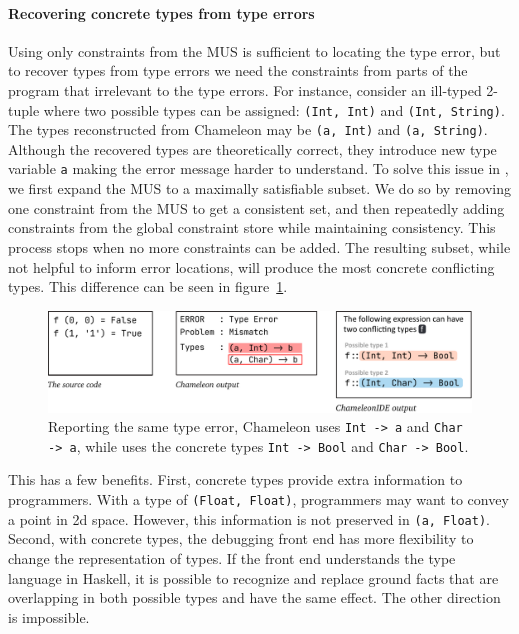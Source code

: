 \paragraph{Recovering concrete types from type errors}


Using only constraints from the MUS is sufficient to locating the type error, but to recover types from type errors we need the constraints from parts of the program that irrelevant to the type errors.  For instance, consider an ill-typed 2-tuple where two possible types can be assigned: \texttt{(Int, Int)} and \texttt{(Int, String)}. The types reconstructed from Chameleon may be \texttt{(a, Int)} and \texttt{(a, String)}. Although the recovered types are theoretically correct, they introduce new type variable \texttt{a} making the error message harder to understand.  To solve this issue in \chameleon{}, we first expand the MUS to a maximally satisfiable subset. We do so by removing one constraint from the MUS to get a consistent set, and then repeatedly adding constraints from the global constraint store while maintaining consistency. This process stops when no more constraints can be added. The resulting subset, while not helpful to inform error locations, will produce the most concrete conflicting types. This difference can be seen in figure~\ref{fig:compare-to-original}. 


\begin{figure}[h]
    \centering
    \includegraphics[width=\linewidth]{images/compare-to-original.pdf}
    \caption{
Reporting the same type error, Chameleon uses
\texttt{Int -> a} and \texttt{Char -> a}, while \chameleon{} uses the 
concrete types \texttt{Int -> Bool} and \texttt{Char -> Bool}.
    }
    \label{fig:compare-to-original}
\end{figure}

This has a few benefits. First, concrete types provide extra information to programmers. With a type of \texttt{(Float, Float)}, programmers may want to convey a point in 2d space. However, this information is not preserved in \texttt{(a, Float)}. Second, with concrete types, the debugging front end has more flexibility to change the representation of types. If the front end
understands the type language in Haskell, it is possible to recognize and replace ground facts that are overlapping in both possible types and have the same effect. The other direction is impossible. 

